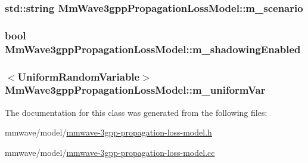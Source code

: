 \subsubsection[{\texorpdfstring{m\+\_\+scenario}{m_scenario}}]{\setlength{\rightskip}{0pt plus 5cm}std\+::string Mm\+Wave3gpp\+Propagation\+Loss\+Model\+::m\+\_\+scenario\hspace{0.3cm}{\ttfamily [private]}}\hypertarget{classMmWave3gppPropagationLossModel_a3ba2b9e45f4d02e49620faf03f97e898}{}\label{classMmWave3gppPropagationLossModel_a3ba2b9e45f4d02e49620faf03f97e898}
\subsubsection[{\texorpdfstring{m\+\_\+shadowing\+Enabled}{m_shadowingEnabled}}]{\setlength{\rightskip}{0pt plus 5cm}bool Mm\+Wave3gpp\+Propagation\+Loss\+Model\+::m\+\_\+shadowing\+Enabled\hspace{0.3cm}{\ttfamily [private]}}\hypertarget{classMmWave3gppPropagationLossModel_ac5ba12ef57c52196b6434d801d2e22af}{}\label{classMmWave3gppPropagationLossModel_ac5ba12ef57c52196b6434d801d2e22af}
\subsubsection[{\texorpdfstring{m\+\_\+uniform\+Var}{m_uniformVar}}]{$<${\bf Uniform\+Random\+Variable}$>$ Mm\+Wave3gpp\+Propagation\+Loss\+Model\+::m\+\_\+uniform\+Var\hspace{0.3cm}{\ttfamily [private]}}\hypertarget{classMmWave3gppPropagationLossModel_a03532a0deaf28490552b0ba27bae9afa}{}\label{classMmWave3gppPropagationLossModel_a03532a0deaf28490552b0ba27bae9afa}


The documentation for this class was generated from the following files\+:\begin{DoxyCompactItemize}
\item 
mmwave/model/\hyperlink{mmwave-3gpp-propagation-loss-model_8h}{mmwave-\/3gpp-\/propagation-\/loss-\/model.\+h}\item 
mmwave/model/\hyperlink{mmwave-3gpp-propagation-loss-model_8cc}{mmwave-\/3gpp-\/propagation-\/loss-\/model.\+cc}\end{DoxyCompactItemize}
